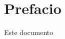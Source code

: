 \documentclass[12pt,a4paper]{book}
\begin{document}
\chapter*{Prefacio}
Este documento

\end{document}

